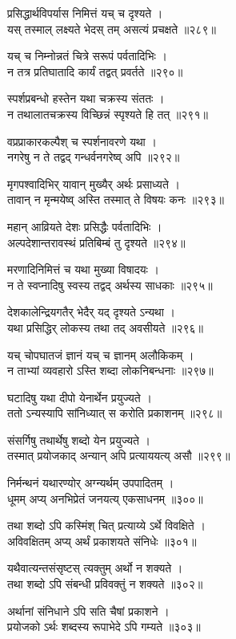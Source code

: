 प्रसिद्धार्थविपर्यास निमित्तं यच् च दृश्यते ।\\यस् तस्माल् लक्ष्यते भेदस् तम् असत्यं प्रचक्षते ॥२८९॥

यच् च निम्नोन्नतं चित्रे सरूपं पर्वतादिभिः ।\\न तत्र प्रतिघातादि कार्यं तद्वत् प्रवर्तते ॥२९०॥

स्पर्शप्रबन्धो हस्तेन यथा चक्रस्य संततः ।\\न तथालातचक्रस्य विच्छिन्नं स्पृश्यते हि तत् ॥२९१॥

वप्रप्राकारकल्पैश् च स्पर्शनावरणे यथा ।\\नगरेषु न ते तद्वद् गन्धर्वनगरेष्व् अपि ॥२९२॥

मृगपश्वादिभिर् यावान् मुख्यैर् अर्थः प्रसाध्यते ।\\तावान् न मृन्मयेष्व् अस्ति तस्मात् ते विषयः कनः ॥२९३॥

महान् आव्रियते देशः प्रसिद्धैः पर्वतादिभिः ।\\अल्पदेशान्तरावस्थं प्रतिबिम्बं तु दृश्यते ॥२९४॥

मरणादिनिमित्तं च यथा मुख्या विषादयः ।\\न ते स्वप्नादिषु स्वस्य तद्वद् अर्थस्य साधकाः ॥२९५॥

देशकालेन्द्रियगतैर् भेदैर् यद् दृश्यते ऽन्यथा ।\\यथा प्रसिद्धिर् लोकस्य तथा तद् अवसीयते ॥२९६॥

यच् चोपघातजं ज्ञानं यच् च ज्ञानम् अलौकिकम् ।\\न ताभ्यां व्यवहारो ऽस्ति शब्दा लोकनिबन्धनाः ॥२९७॥

घटादिषु यथा दीपो येनार्थेन प्रयुज्यते ।\\ततो ऽन्यस्यापि सांनिध्यात् स करोति प्रकाशनम् ॥२९८॥

संसर्गिषु तथार्थेषु शब्दो येन प्रयुज्यते ।\\तस्मात् प्रयोजकाद् अन्यान् अपि प्रत्याययत्य् असौ ॥२९९॥

निर्मन्थनं यथारण्योर् अग्न्यर्थम् उपपादितम् ।\\धूमम् अप्य् अनभिप्रेतं जनयत्य् एकसाधनम् ॥३००॥

तथा शब्दो ऽपि कस्मिंश् चित् प्रत्याय्ये ऽर्थे विवक्षिते ।\\अविवक्षितम् अप्य् अर्थं प्रकाशयते संनिधेः ॥३०१॥

यथैवात्यन्तसंसृष्टस् त्यक्तुम् अर्थो न शक्यते ।\\तथा शब्दो ऽपि संबन्धी प्रविवक्तुं न शक्यते ॥३०२॥

अर्थानां संनिधाने ऽपि सति चैषां प्रकाशने ।\\प्रयोजको ऽर्थः शब्दस्य रूपाभेदे ऽपि गम्यते ॥३०३॥

